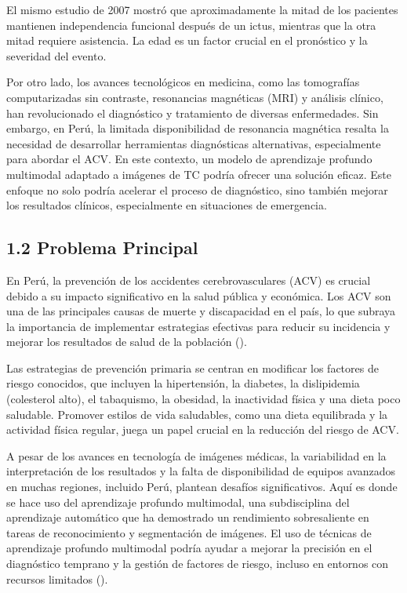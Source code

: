 El mismo estudio de 2007 mostró que aproximadamente la mitad de los pacientes mantienen independencia funcional después de un ictus, mientras que la otra mitad requiere asistencia. La edad es un factor crucial en el pronóstico y la severidad del evento.
\newline

Por otro lado, los avances tecnológicos en medicina, como las tomografías computarizadas sin contraste, resonancias magnéticas (MRI) y análisis clínico, han revolucionado el diagnóstico y tratamiento de diversas enfermedades. Sin embargo, en Perú, la limitada disponibilidad de resonancia magnética resalta la necesidad de desarrollar herramientas diagnósticas alternativas, especialmente para abordar el ACV. En este contexto, un modelo de aprendizaje profundo multimodal adaptado a imágenes de TC podría ofrecer una solución eficaz. Este enfoque no solo podría acelerar el proceso de diagnóstico, sino también mejorar los resultados clínicos, especialmente en situaciones de emergencia.
\newline

\subsection{1.2 Problema Principal}
En Perú, la prevención de los accidentes cerebrovasculares (ACV) es crucial debido a su impacto significativo en la salud pública y económica. Los ACV son una de las principales causas de muerte y discapacidad en el país, lo que subraya la importancia de implementar estrategias efectivas para reducir su incidencia y mejorar los resultados de salud de la población (\cite{MALAGA2018}).
\newline

Las estrategias de prevención primaria se centran en modificar los factores de riesgo conocidos, que incluyen la hipertensión, la diabetes, la dislipidemia (colesterol alto), el tabaquismo, la obesidad, la inactividad física y una dieta poco saludable. Promover estilos de vida saludables, como una dieta equilibrada y la actividad física regular, juega un papel crucial en la reducción del riesgo de ACV.
\newline

A pesar de los avances en tecnología de imágenes médicas, la variabilidad en la interpretación de los resultados y la falta de disponibilidad de equipos avanzados en muchas regiones, incluido Perú, plantean desafíos significativos. Aquí es donde se hace uso del aprendizaje profundo multimodal, una subdisciplina del aprendizaje automático que ha demostrado un rendimiento sobresaliente en tareas de reconocimiento y segmentación de imágenes. El uso de técnicas de aprendizaje profundo multimodal podría ayudar a mejorar la precisión en el diagnóstico temprano y la gestión de factores de riesgo, incluso en entornos con recursos limitados (\cite{incn2024}).
\newline

